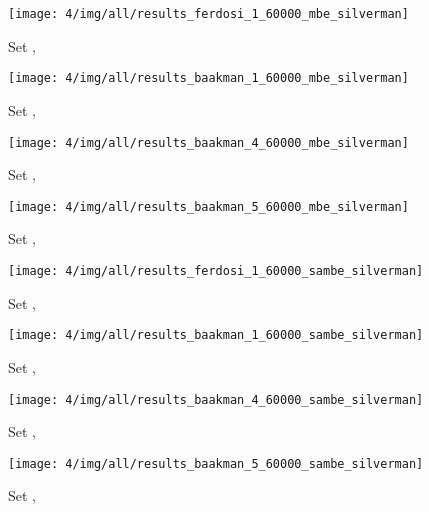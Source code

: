 
\begin{subfigure}{0.23\textwidth}
	\centering
	\texttt{[image: 4/img/all/results\_ferdosi\_1\_60000\_mbe\_silverman]}
	\caption{Set \ferdosiOne, \mbe}
	\label{fig:4:results:mbe:ferdosi1}
\end{subfigure}
\begin{subfigure}{0.23\textwidth}
	\centering
	\texttt{[image: 4/img/all/results\_baakman\_1\_60000\_mbe\_silverman]}
	\caption{Set \baakmanOne, \mbe}
	\label{fig:4:results:mbe:baakman1}
\end{subfigure}
\begin{subfigure}{0.23\textwidth}
	\centering
	\texttt{[image: 4/img/all/results\_baakman\_4\_60000\_mbe\_silverman]}
	\caption{Set \baakmanFour, \mbe}
	\label{fig:4:results:mbe:baakman4}
\end{subfigure}	
\begin{subfigure}{0.23\textwidth}
	\centering
	\texttt{[image: 4/img/all/results\_baakman\_5\_60000\_mbe\_silverman]}
	\caption{Set \baakmanFive, \mbe}
	\label{fig:4:results:mbe:baakman5}
\end{subfigure}
\begin{subfigure}{0.23\textwidth}
	\centering
	\texttt{[image: 4/img/all/results\_ferdosi\_1\_60000\_sambe\_silverman]}
	\caption{Set \ferdosiOne, \sambe}
	\label{fig:4:results:sambe:ferdosi1}
\end{subfigure}
\begin{subfigure}{0.23\textwidth}
	\centering
	\texttt{[image: 4/img/all/results\_baakman\_1\_60000\_sambe\_silverman]}
	\caption{Set \baakmanOne, \sambe}
	\label{fig:4:results:sambe:baakman1}
\end{subfigure}
\begin{subfigure}{0.23\textwidth}
	\centering
	\texttt{[image: 4/img/all/results\_baakman\_4\_60000\_sambe\_silverman]}
	\caption{Set \baakmanFour, \sambe}
	\label{fig:4:results:sambe:baakman4}
\end{subfigure}		
\begin{subfigure}{0.23\textwidth}
	\centering
	\texttt{[image: 4/img/all/results\_baakman\_5\_60000\_sambe\_silverman]}
	\caption{Set \baakmanFive, \sambe}
	\label{fig:4:results:sambe:baakman5}
\end{subfigure}	